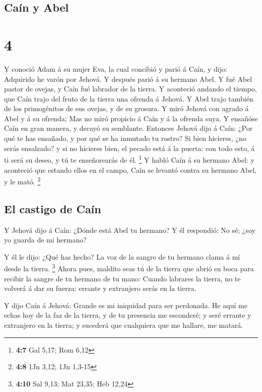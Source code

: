 \hypertarget{cauxedn-y-abel}{%
\subsection{Caín y Abel}\label{cauxedn-y-abel}}

\hypertarget{section-3}{%
\section{4}\label{section-3}}

 Y conoció Adam á su mujer Eva, la cual concibió y parió á
Caín, y dijo: Adquirido he varón por Jehová.  Y después
parió á su hermano Abel. Y fué Abel pastor de ovejas, y Caín fué
labrador de la tierra.  Y aconteció andando el tiempo, que
Caín trajo del fruto de la tierra una ofrenda á Jehová.  Y
Abel trajo también de los primogénitos de sus ovejas, y de su grosura. Y
miró Jehová con agrado á Abel y á su ofrenda;  Mas no miró
propicio á Caín y á la ofrenda suya. Y ensañóse Caín en gran manera, y
decayó su semblante.  Entonces Jehová dijo á Caín: ¿Por
qué te has ensañado, y por qué se ha inmutado tu rostro? 
Si bien hicieres, ¿no serás ensalzado? y si no hicieres bien, el pecado
está á la puerta: con todo esto, á ti será su deseo, y tú te
enseñorearás de él. \footnote{\textbf{4:7} Gal 5,17; Rom 6,12}
 Y habló Caín á su hermano Abel: y aconteció que estando
ellos en el campo, Caín se levantó contra su hermano Abel, y le mató.
\footnote{\textbf{4:8} 1Jn 3,12; 1Jn 1,3-15}

\hypertarget{el-castigo-de-cauxedn}{%
\subsection{El castigo de Caín}\label{el-castigo-de-cauxedn}}

 Y Jehová dijo á Caín: ¿Dónde está Abel tu hermano? Y él
respondió: No sé; ¿soy yo guarda de mi hermano?

 Y él le dijo: ¿Qué has hecho? La voz de la sangre de tu
hermano clama á mí desde la tierra. \footnote{\textbf{4:10} Sal 9,13;
  Mat 23,35; Heb 12,24}  Ahora pues, maldito seas tú de
la tierra que abrió su boca para recibir la sangre de tu hermano de tu
mano:  Cuando labrares la tierra, no te volverá á dar su
fuerza: errante y extranjero serás en la tierra.

 Y dijo Caín á Jehová: Grande es mi iniquidad para ser
perdonada.  He aquí me echas hoy de la faz de la tierra,
y de tu presencia me esconderé; y seré errante y extranjero en la
tierra; y sucederá que cualquiera que me hallare, me matará.

